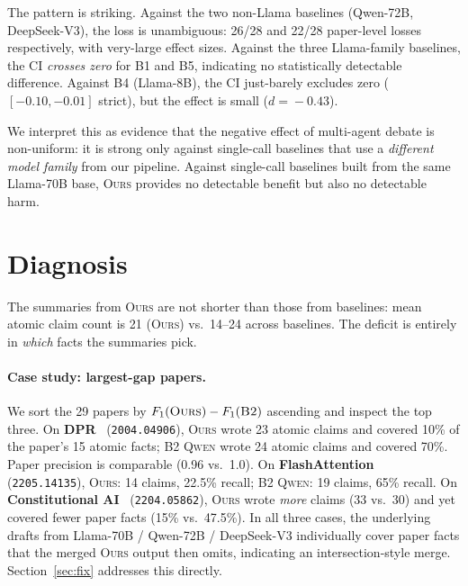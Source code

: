 \documentclass[11pt,a4paper]{article}
\begin{document}
The pattern is striking. Against the two non-Llama baselines (Qwen-72B,
DeepSeek-V3), the loss is unambiguous: 26/28 and 22/28 paper-level
losses respectively, with very-large effect sizes. Against the three
Llama-family baselines, the CI \emph{crosses zero} for B1 and B5,
indicating no statistically detectable difference. Against B4
(Llama-8B), the CI just-barely excludes zero ($[-0.10,-0.01]$ strict),
but the effect is small ($d\!=\!-0.43$).

We interpret this as evidence that the negative effect of multi-agent
debate is non-uniform: it is strong only against single-call baselines
that use a \emph{different model family} from our pipeline. Against
single-call baselines built from the same Llama-70B base, \textsc{Ours}
provides no detectable benefit but also no detectable harm.

\section{Diagnosis}
\label{sec:diagnosis}

The summaries from \textsc{Ours} are not shorter than those from
baselines: mean atomic claim count is 21 (\textsc{Ours}) vs.\ 14--24
across baselines. The deficit is entirely in \emph{which} facts the
summaries pick.

\paragraph{Case study: largest-gap papers.}
We sort the 29 papers by $F_1(\textsc{Ours}) - F_1(\textsc{B2})$ ascending
and inspect the top three. On \textbf{DPR}~\cite{karpukhin2020dpr}
(\texttt{2004.04906}), \textsc{Ours} wrote 23 atomic claims and covered
10\% of the paper's 15 atomic facts; \textsc{B2 Qwen} wrote 24 atomic
claims and covered 70\%. Paper precision is comparable (0.96 vs.\ 1.0).
On \textbf{FlashAttention}~\cite{dao2022flashattention}
(\texttt{2205.14135}), \textsc{Ours}: 14 claims, 22.5\% recall;
\textsc{B2 Qwen}: 19 claims, 65\% recall. On
\textbf{Constitutional AI}~\cite{bai2022constitutionalai}
(\texttt{2204.05862}), \textsc{Ours} wrote \emph{more} claims (33 vs.\
30) and yet covered fewer paper facts (15\% vs.\ 47.5\%). In all three
cases, the underlying drafts from Llama-70B / Qwen-72B / DeepSeek-V3
individually cover paper facts that the merged \textsc{Ours} output then
omits, indicating an intersection-style merge. Section~\ref{sec:fix}
addresses this directly.
\end{document}
